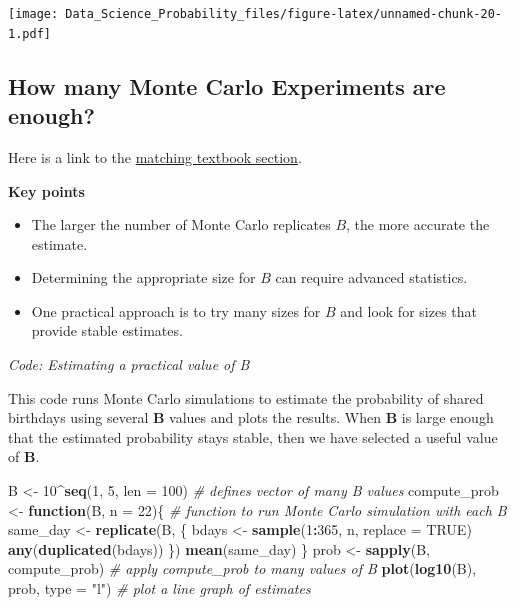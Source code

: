 \documentclass[
]{article}
\newenvironment{Shaded}{\begin{snugshade}}{\end{snugshade}}
\newcommand{\CommentTok}[1]{\textcolor[rgb]{0.56,0.35,0.01}{\textit{#1}}}
\newcommand{\ControlFlowTok}[1]{\textcolor[rgb]{0.13,0.29,0.53}{\textbf{#1}}}
\newcommand{\DataTypeTok}[1]{\textcolor[rgb]{0.13,0.29,0.53}{#1}}
\newcommand{\DecValTok}[1]{\textcolor[rgb]{0.00,0.00,0.81}{#1}}
\newcommand{\KeywordTok}[1]{\textcolor[rgb]{0.13,0.29,0.53}{\textbf{#1}}}
\newcommand{\NormalTok}[1]{#1}
\newcommand{\OperatorTok}[1]{\textcolor[rgb]{0.81,0.36,0.00}{\textbf{#1}}}
\newcommand{\OtherTok}[1]{\textcolor[rgb]{0.56,0.35,0.01}{#1}}
\newcommand{\StringTok}[1]{\textcolor[rgb]{0.31,0.60,0.02}{#1}}
\providecommand{\tightlist}{%
  \setlength{\itemsep}{0pt}\setlength{\parskip}{0pt}}
\begin{document}
\texttt{[image: Data\_Science\_Probability\_files/figure-latex/unnamed-chunk-20-1.pdf]}

\hypertarget{how-many-monte-carlo-experiments-are-enough}{%
\subsection{How many Monte Carlo Experiments are
enough?}\label{how-many-monte-carlo-experiments-are-enough}}

Here is a link to the
\href{https://rafalab.github.io/dsbook/probability.html\#infinity-in-practice}{matching
textbook section}.

\textbf{Key points}

\begin{itemize}
\tightlist
\item
  The larger the number of Monte Carlo replicates \(B\), the more
  accurate the estimate.
\item
  Determining the appropriate size for \(B\) can require advanced
  statistics.
\item
  One practical approach is to try many sizes for \(B\) and look for
  sizes that provide stable estimates.
\end{itemize}

\emph{Code: Estimating a practical value of B}

This code runs Monte Carlo simulations to estimate the probability of
shared birthdays using several \textbf{B} values and plots the results.
When \textbf{B} is large enough that the estimated probability stays
stable, then we have selected a useful value of \textbf{B}.

\begin{Shaded}
\begin{Highlighting}[]
\NormalTok{B \textless{}{-}}\StringTok{ }\DecValTok{10}\OperatorTok{\^{}}\KeywordTok{seq}\NormalTok{(}\DecValTok{1}\NormalTok{, }\DecValTok{5}\NormalTok{, }\DataTypeTok{len =} \DecValTok{100}\NormalTok{)    }\CommentTok{\# defines vector of many B values}
\NormalTok{compute\_prob \textless{}{-}}\StringTok{ }\ControlFlowTok{function}\NormalTok{(B, }\DataTypeTok{n =} \DecValTok{22}\NormalTok{)\{    }\CommentTok{\# function to run Monte Carlo simulation with each B}
\NormalTok{    same\_day \textless{}{-}}\StringTok{ }\KeywordTok{replicate}\NormalTok{(B, \{}
\NormalTok{        bdays \textless{}{-}}\StringTok{ }\KeywordTok{sample}\NormalTok{(}\DecValTok{1}\OperatorTok{:}\DecValTok{365}\NormalTok{, n, }\DataTypeTok{replace =} \OtherTok{TRUE}\NormalTok{)}
        \KeywordTok{any}\NormalTok{(}\KeywordTok{duplicated}\NormalTok{(bdays))}
\NormalTok{    \})}
    \KeywordTok{mean}\NormalTok{(same\_day)}
\NormalTok{\}}
\NormalTok{prob \textless{}{-}}\StringTok{ }\KeywordTok{sapply}\NormalTok{(B, compute\_prob)    }\CommentTok{\# apply compute\_prob to many values of B}
\KeywordTok{plot}\NormalTok{(}\KeywordTok{log10}\NormalTok{(B), prob, }\DataTypeTok{type =} \StringTok{"l"}\NormalTok{)    }\CommentTok{\# plot a line graph of estimates}
\end{Highlighting}
\end{Shaded}
\end{document}
